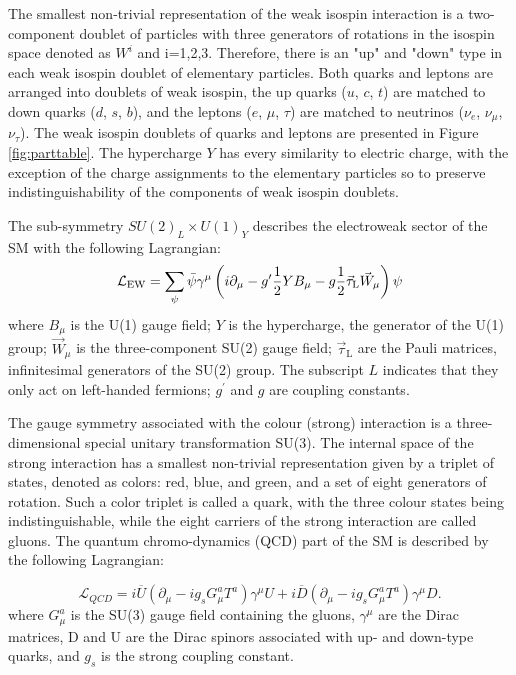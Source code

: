 The smallest non-trivial representation of the weak isospin interaction is
a two-component doublet of particles with three generators
of rotations in the isospin space denoted as $W^i$ and i=1,2,3.
Therefore, there is an "up" and "down" type in each weak isospin doublet of elementary particles.
Both quarks and leptons are arranged into doublets of weak isospin, the up quarks ($u$, $c$, $t$)
are matched to down quarks ($d$, $s$, $b$), and the leptons ($e$, $\mu$, $\tau$) are matched
to neutrinos ($\nu_e$, $\nu_{\mu}$, $\nu_{\tau}$). The weak isospin doublets of quarks and leptons
are presented in Figure \ref{fig:parttable}.  
The hypercharge $Y$ has every similarity to electric charge, with the exception of the
charge assignments to the elementary particles so to preserve indistinguishability of the components
of weak isospin doublets.

The sub-symmetry $SU(2)_L \times U(1)_Y$ describes the electroweak sector of the SM with the 
following Lagrangian:
\begin{equation}
\mathcal{L}_\mathrm{EW} = \sum_\psi\bar\psi\gamma^\mu \left(i\partial_\mu-g^\prime{1\over2}YB_\mu-g{1\over2}\vec\tau_\mathrm{L}\vec W_\mu\right)\psi
\label{eqn:LagrEWK}
\end{equation}
where $B_{\mu}$ is the U(1) gauge field; $Y$ is the hypercharge, the generator of 
the U(1) group; $\vec{W}_\mu$ is the three-component SU(2) gauge field; $\vec{\tau}_\mathrm{L}$
 are the Pauli matrices, infinitesimal generators of the SU(2) group. 
The subscript $L$ indicates that they only act on left-handed fermions; $g^{'}$ and $g$
 are coupling constants.


The gauge symmetry associated with the colour (strong) interaction is a three-dimensional special
unitary transformation SU(3). The internal space of the strong interaction has a smallest
non-trivial representation given by a triplet of states, denoted as colors: red, blue, and green,
and a set of eight generators of rotation. Such a color triplet is called a quark, with the
three colour states being indistinguishable, while the
eight carriers of the strong interaction are called gluons. 
The quantum chromo-dynamics (QCD)
part of the SM is described by the following Lagrangian:

\begin{equation}
\mathcal{L}_{QCD} = i\overline U (\partial_\mu-ig_sG_\mu^a T^a)\gamma^\mu U + i\overline D (\partial_\mu-i g_s G_\mu^a T^a)\gamma^\mu D.
\label{eqn:LagrQCD}
\end{equation}
where $G_\mu^a$ is the SU(3) gauge field containing the gluons, $\gamma^\mu$ are the Dirac matrices,
 D and U are the Dirac spinors associated with up- and down-type quarks, and $g_s$ 
is the strong coupling constant.

